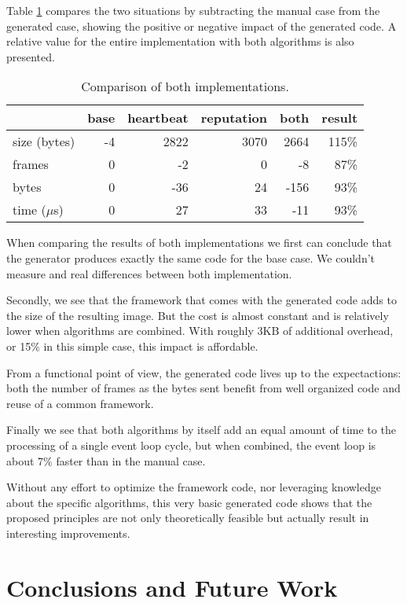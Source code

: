 \documentclass[conference]{IEEEtran}
\begin{document}
Table \ref{tbl:summary} compares the two situations by subtracting the manual
case from the generated case, showing the positive or negative impact of the
generated code. A relative value for the entire implementation with both
algorithms is also presented.

\begin{table}[H]
  \centering
  \begin{tabular}{lrrrrr}
  \hline
                & base & heartbeat & reputation & both  & result \\
  \hline
  size (bytes)  & -4    & 2822     & 3070       & 2664  & 115\%  \\
  frames        & 0     & -2       & 0          & -8    & 87\%   \\
  bytes         & 0     & -36      & 24         & -156  & 93\%   \\
  time ($\mu$s) & 0     & 27       & 33         & -11   & 93\%   \\
  \hline
  \end{tabular}
  \caption{Comparison of both implementations.}
  \label{tbl:summary}
\end{table}

When comparing the results of both implementations we first can conclude that
the generator produces exactly the same code for the base case. We couldn't
measure and real differences between both implementation.

Secondly, we see that the framework that comes with the generated code adds to
the size of the resulting image. But the cost is almost constant and is
relatively lower when algorithms are combined. With roughly 3KB of additional
overhead, or 15\% in this simple case, this impact is affordable.

From a functional point of view, the generated code lives up to the
expectactions: both the number of frames as the bytes sent benefit from well
organized code and reuse of a common framework.

Finally we see that both algorithms by itself add an equal amount of time to
the processing of a single event loop cycle, but when combined, the event loop
is about 7\% faster than in the manual case.

Without any effort to optimize the framework code, nor leveraging knowledge
about the specific algorithms, this very basic generated code shows that the
proposed principles are not only theoretically feasible but actually result in
interesting improvements.

\section{Conclusions and Future Work}
\label{section:conclusions}
\end{document}
